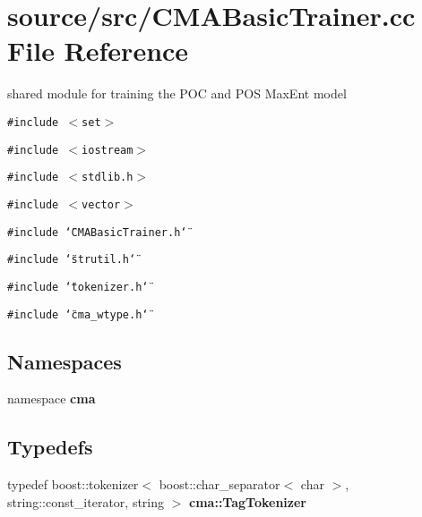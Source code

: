 \section{source/src/CMABasicTrainer.cc File Reference}
\label{CMABasicTrainer_8cc}
shared module for training the POC and POS MaxEnt model 

{\tt \#include $<$set$>$}\par
{\tt \#include $<$iostream$>$}\par
{\tt \#include $<$stdlib.h$>$}\par
{\tt \#include $<$vector$>$}\par
{\tt \#include \char`\"{}CMABasicTrainer.h\char`\"{}}\par
{\tt \#include \char`\"{}strutil.h\char`\"{}}\par
{\tt \#include \char`\"{}tokenizer.h\char`\"{}}\par
{\tt \#include \char`\"{}cma\_\-wtype.h\char`\"{}}\par
\subsection*{Namespaces}
\begin{CompactItemize}
\item 
namespace \textbf{cma}
\end{CompactItemize}
\subsection*{Typedefs}
\begin{CompactItemize}
\item 
typedef boost::tokenizer$<$ boost::char\_\-separator$<$ char $>$, string::const\_\-iterator, string $>$ \textbf{cma::TagTokenizer}\label{namespacecma_a0c6c2dc82197fc6600c20a59cade565}

\end{CompactItemize}
